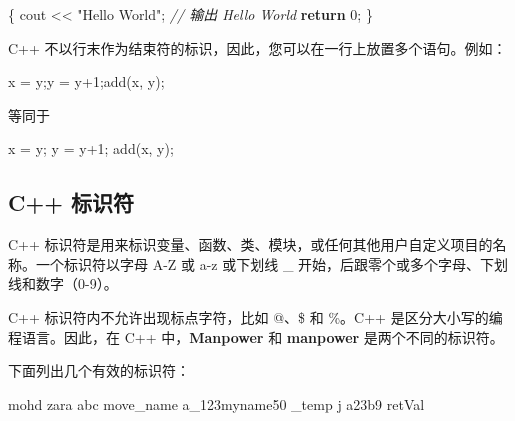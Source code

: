 \documentclass[
]{article}
\newenvironment{Shaded}{}{}
\newcommand{\CommentTok}[1]{\textcolor[rgb]{0.38,0.63,0.69}{\textit{#1}}}
\newcommand{\ControlFlowTok}[1]{\textcolor[rgb]{0.00,0.44,0.13}{\textbf{#1}}}
\newcommand{\DecValTok}[1]{\textcolor[rgb]{0.25,0.63,0.44}{#1}}
\newcommand{\NormalTok}[1]{#1}
\newcommand{\OperatorTok}[1]{\textcolor[rgb]{0.40,0.40,0.40}{#1}}
\newcommand{\StringTok}[1]{\textcolor[rgb]{0.25,0.44,0.63}{#1}}
\begin{document}
\begin{Shaded}
\begin{Highlighting}[]
\OperatorTok{\{}
\NormalTok{   cout }\OperatorTok{\textless{}\textless{}} \StringTok{"Hello World"}\OperatorTok{;} \CommentTok{// 输出 Hello World   }
   \ControlFlowTok{return} \DecValTok{0}\OperatorTok{;}
\OperatorTok{\}}
\end{Highlighting}
\end{Shaded}

C++ 不以行末作为结束符的标识，因此，您可以在一行上放置多个语句。例如：

\begin{Shaded}
\begin{Highlighting}[]
\NormalTok{x }\OperatorTok{=}\NormalTok{ y}\OperatorTok{;}\NormalTok{y }\OperatorTok{=}\NormalTok{ y}\OperatorTok{+}\DecValTok{1}\OperatorTok{;}\NormalTok{add}\OperatorTok{(}\NormalTok{x}\OperatorTok{,}\NormalTok{ y}\OperatorTok{);}
\end{Highlighting}
\end{Shaded}

等同于

\begin{Shaded}
\begin{Highlighting}[]
\NormalTok{x }\OperatorTok{=}\NormalTok{ y}\OperatorTok{;}\NormalTok{ y }\OperatorTok{=}\NormalTok{ y}\OperatorTok{+}\DecValTok{1}\OperatorTok{;}\NormalTok{ add}\OperatorTok{(}\NormalTok{x}\OperatorTok{,}\NormalTok{ y}\OperatorTok{);}
\end{Highlighting}
\end{Shaded}

\hypertarget{c-ux6807ux8bc6ux7b26}{%
\subsection{C++ 标识符}\label{c-ux6807ux8bc6ux7b26}}

C++
标识符是用来标识变量、函数、类、模块，或任何其他用户自定义项目的名称。一个标识符以字母
A-Z 或 a-z 或下划线 \_ 开始，后跟零个或多个字母、下划线和数字（0-9）。

C++ 标识符内不允许出现标点字符，比如 @、\$ 和 \%。C++
是区分大小写的编程语言。因此，在 C++ 中，\textbf{Manpower} 和
\textbf{manpower} 是两个不同的标识符。

下面列出几个有效的标识符：

\begin{Shaded}
\begin{Highlighting}[]
\NormalTok{mohd       zara    abc   move\_name  a\_123myname50   \_temp   j     a23b9      retVal}
\end{Highlighting}
\end{Shaded}
\end{document}

